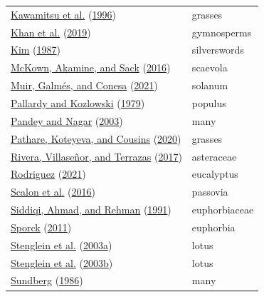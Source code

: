 \documentclass[
  10pt,
]{article}
\begin{document}
\begin{longtable}[]{@{}ll@{}}
\protect\hyperlink{ref-kawamitsu_stomatal_1996}{Kawamitsu et al.} (\protect\hyperlink{ref-kawamitsu_stomatal_1996}{1996}) & grasses \\
\protect\hyperlink{ref-khan_taxonomic_2019}{Khan et al.} (\protect\hyperlink{ref-khan_taxonomic_2019}{2019}) & gymnosperms \\
\protect\hyperlink{ref-kim_comparative_1987}{Kim} (\protect\hyperlink{ref-kim_comparative_1987}{1987}) & silverswords \\
\protect\hyperlink{ref-mckown_trait_2016}{McKown, Akamine, and Sack} (\protect\hyperlink{ref-mckown_trait_2016}{2016}) & scaevola \\
\protect\hyperlink{ref-muir_unpublished_2021}{Muir, Galmés, and Conesa} (\protect\hyperlink{ref-muir_unpublished_2021}{2021}) & solanum \\
\protect\hyperlink{ref-pallardy_frequency_1979}{Pallardy and Kozlowski} (\protect\hyperlink{ref-pallardy_frequency_1979}{1979}) & populus \\
\protect\hyperlink{ref-pandey_patterns_2003}{Pandey and Nagar} (\protect\hyperlink{ref-pandey_patterns_2003}{2003}) & many \\
\protect\hyperlink{ref-pathare_increased_2020}{Pathare, Koteyeva, and Cousins} (\protect\hyperlink{ref-pathare_increased_2020}{2020}) & grasses \\
\protect\hyperlink{ref-rivera_meso-_2017}{Rivera, Villaseñor, and Terrazas} (\protect\hyperlink{ref-rivera_meso-_2017}{2017}) & asteraceae \\
\protect\hyperlink{ref-rodriguez_unpublished_2021}{Rodriguez} (\protect\hyperlink{ref-rodriguez_unpublished_2021}{2021}) & eucalyptus \\
\protect\hyperlink{ref-scalon_leaf_2016}{Scalon et al.} (\protect\hyperlink{ref-scalon_leaf_2016}{2016}) & passovia \\
\protect\hyperlink{ref-siddiqi_contribution_1991}{Siddiqi, Ahmad, and Rehman} (\protect\hyperlink{ref-siddiqi_contribution_1991}{1991}) & euphorbiaceae \\
\protect\hyperlink{ref-sporck_hawaiian_2011}{Sporck} (\protect\hyperlink{ref-sporck_hawaiian_2011}{2011}) & euphorbia \\
\protect\hyperlink{ref-stenglein_leaf_2003}{Stenglein et al.} (\protect\hyperlink{ref-stenglein_leaf_2003}{2003a}) & lotus \\
\protect\hyperlink{ref-stenglein_leaf_2003-1}{Stenglein et al.} (\protect\hyperlink{ref-stenglein_leaf_2003-1}{2003b}) & lotus \\
\protect\hyperlink{ref-sundberg_comparison_1986}{Sundberg} (\protect\hyperlink{ref-sundberg_comparison_1986}{1986}) & many \\

\end{longtable}
\end{document}
